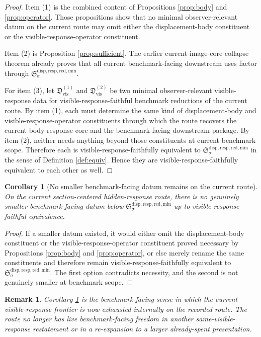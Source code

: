 \documentclass[11pt]{article}
\newcommand{\MinimalReducedStructure}{\mathfrak S^{\mathrm{disp,resp,red,min}}}
\newcommand{\VisibleDatum}{\mathfrak D_{\mathrm{vis}}}
\newtheorem{remark}{Remark}
\newtheorem{corollary}{Corollary}
\begin{document}
\begin{proof}
Item (1) is the combined content of Propositions \ref{prop:body} and \ref{prop:operator}. Those propositions show that no minimal observer-relevant datum on the current route may omit either the displacement-body constituent or the visible-response-operator constituent.

Item (2) is Proposition \ref{prop:sufficient}. The earlier current-image-core collapse theorem already proves that all current benchmark-facing downstream uses factor through \(\MinimalReducedStructure_{\sigma}\).

For item (3), let \(\VisibleDatum^{(1)}\) and \(\VisibleDatum^{(2)}\) be two minimal observer-relevant visible-response data for visible-response-faithful benchmark reductions of the current route. By item (1), each must determine the same kind of displacement-body and visible-response-operator constituents through which the route recovers the current body-response core and the benchmark-facing downstream package. By item (2), neither needs anything beyond those constituents at current benchmark scope. Therefore each is visible-response-faithfully equivalent to \(\MinimalReducedStructure_{\sigma}\) in the sense of Definition \ref{def:equiv}. Hence they are visible-response-faithfully equivalent to each other as well.
\end{proof}

\begin{corollary}[No smaller benchmark-facing datum remains on the current route]
\label{cor:minimal}
On the current section-centered hidden-response route, there is no genuinely smaller benchmark-facing datum below \(\MinimalReducedStructure_{\sigma}\) up to visible-response-faithful equivalence.
\end{corollary}

\begin{proof}
If a smaller datum existed, it would either omit the displacement-body constituent or the visible-response-operator constituent proved necessary by Propositions \ref{prop:body} and \ref{prop:operator}, or else merely rename the same constituents and therefore remain visible-response-faithfully equivalent to \(\MinimalReducedStructure_{\sigma}\). The first option contradicts necessity, and the second is not genuinely smaller at benchmark scope.
\end{proof}

\begin{remark}
Corollary \ref{cor:minimal} is the benchmark-facing sense in which the current visible-response frontier is now exhausted internally on the recorded route. The route no longer has live benchmark-facing freedom in another same-visible-response restatement or in a re-expansion to a larger already-spent presentation.
\end{remark}
\end{document}

